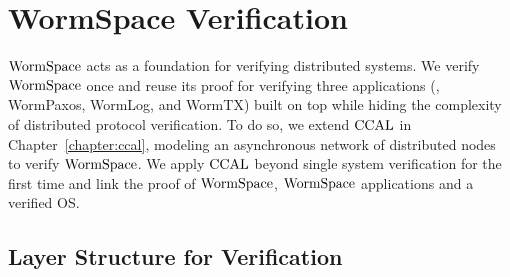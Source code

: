 \section{WormSpace Verification}
\label{sec:formal_verification}


$\mathrm{WormSpace}$ acts as a foundation for verifying distributed systems. 
We verify $\mathrm{WormSpace}$ once and reuse its proof for verifying three applications (\ie, WormPaxos, WormLog, and WormTX)
built on top while hiding the complexity of distributed protocol verification.     
To do so, we extend  $\mathrm{CCAL}$  in Chapter~\ref{chapter:ccal}, 
modeling an asynchronous network of distributed nodes to verify $\mathrm{WormSpace}$. 
We apply $\mathrm{CCAL}$ beyond single system verification for the first time and link the proof of $\mathrm{WormSpace}$, 
$\mathrm{WormSpace}$ applications and a verified OS. 

\subsection{Layer Structure for Verification}

